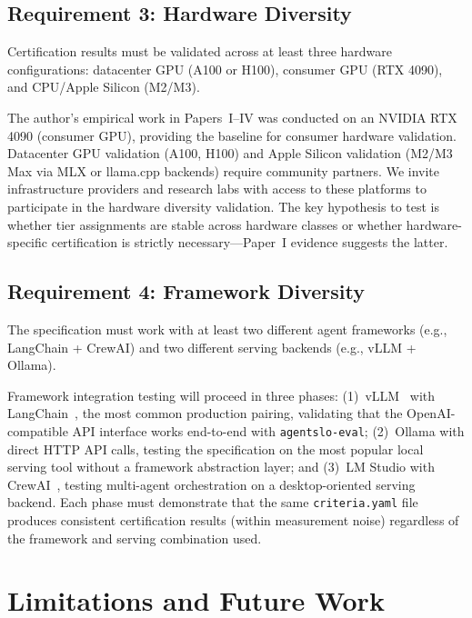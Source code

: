 \documentclass[11pt]{article}
\newcommand{\criteriayaml}{\texttt{criteria.yaml}}
\begin{document}
\subsection{Requirement 3: Hardware Diversity}

Certification results must be validated across at least three hardware configurations: datacenter GPU (A100 or H100), consumer GPU (RTX 4090), and CPU/Apple Silicon (M2/M3).

The author's empirical work in Papers~I--IV was conducted on an NVIDIA RTX 4090 (consumer GPU), providing the baseline for consumer hardware validation. Datacenter GPU validation (A100, H100) and Apple Silicon validation (M2/M3 Max via MLX or llama.cpp backends) require community partners. We invite infrastructure providers and research labs with access to these platforms to participate in the hardware diversity validation. The key hypothesis to test is whether tier assignments are stable across hardware classes or whether hardware-specific certification is strictly necessary---Paper~I evidence suggests the latter.

\subsection{Requirement 4: Framework Diversity}

The specification must work with at least two different agent frameworks (e.g., LangChain + CrewAI) and two different serving backends (e.g., vLLM + Ollama).

Framework integration testing will proceed in three phases: (1)~vLLM~\citep{kwon2023vllm} with LangChain~\citep{langchain2023}, the most common production pairing, validating that the OpenAI-compatible API interface works end-to-end with \texttt{agentslo-eval}; (2)~Ollama with direct HTTP API calls, testing the specification on the most popular local serving tool without a framework abstraction layer; and (3)~LM Studio with CrewAI~\citep{crewai2024}, testing multi-agent orchestration on a desktop-oriented serving backend. Each phase must demonstrate that the same \criteriayaml{} file produces consistent certification results (within measurement noise) regardless of the framework and serving combination used.


\section{Limitations and Future Work}
\label{sec:future}
\end{document}
